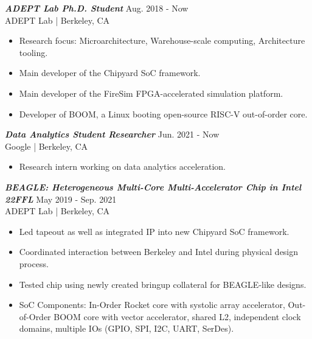 \documentclass[letter]{res}
\begin{document}
\begin{resume}
{\sl \textbf{ADEPT Lab Ph.D. Student}} \hfill Aug. 2018 - Now\\
ADEPT Lab | Berkeley, CA \newline

 \vspace{-4mm}

 \begin{itemize}
 \item Research focus: Microarchitecture, Warehouse-scale computing, Architecture tooling.
 \item Main developer of the Chipyard SoC framework.
 \item Main developer of the FireSim FPGA-accelerated simulation platform.
 \item Developer of BOOM, a Linux booting open-source RISC-V out-of-order core.
 \end{itemize}

\vspace{-2mm}

{\sl \textbf{Data Analytics Student Researcher}} \hfill Jun. 2021 - Now\\
Google | Berkeley, CA \newline

 \vspace{-4mm}

 \begin{itemize}
 \item Research intern working on data analytics acceleration.
 \end{itemize}

\vspace{-2mm}

{\sl \textbf{BEAGLE: Heterogeneous Multi-Core Multi-Accelerator Chip in Intel 22FFL}} \hfill May 2019 - Sep. 2021\\
ADEPT Lab | Berkeley, CA \newline

 \vspace{-4mm}

 \begin{itemize}
 \item Led tapeout as well as integrated IP into new Chipyard SoC framework.
 \item Coordinated interaction between Berkeley and Intel during physical design process.
 \item Tested chip using newly created bringup collateral for BEAGLE-like designs.
 \item SoC Components: In-Order Rocket core with systolic array accelerator, Out-of-Order BOOM core with vector accelerator, shared L2, independent clock domains, multiple IOs (GPIO, SPI, I2C, UART, SerDes).
 \end{itemize}


\end{resume}
\end{document}
